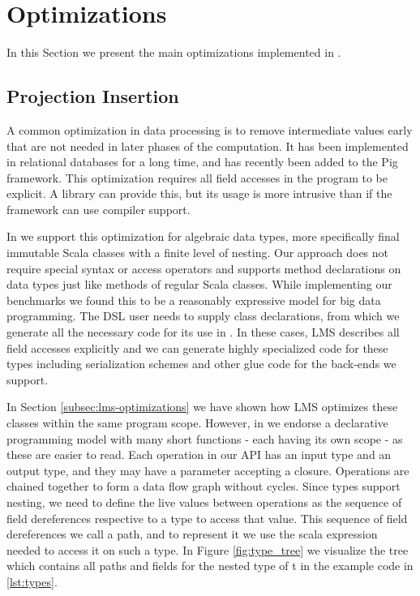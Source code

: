 \section{Optimizations}
\label{sec:optimizations}
In this Section we present the main optimizations implemented in \tool.
\subsection{Projection Insertion}
\label{sec:field-reduction}

A common optimization in data processing is to remove intermediate values early that are not needed in later phases of the computation. It has been implemented in relational databases for a long time, and has recently been added to the Pig framework. This optimization requires all field accesses in the program to be explicit. A library can provide this, but its usage is more intrusive than if the framework can use compiler support. 

In \tool we support this optimization for algebraic data types, more specifically final immutable Scala classes with a finite level of nesting. Our approach does not require special syntax or access operators and supports method declarations on data types just like methods of regular Scala classes. While implementing our benchmarks we found this to be a reasonably expressive model for big data programming. The DSL user needs to supply class declarations, from which we generate all the necessary code for its use in \tool. In these cases, LMS describes all field accesses explicitly and we can generate highly specialized code for these types including serialization schemes and other glue code for the back-ends we support.



In Section \ref{subsec:lms-optimizations} we have shown how LMS optimizes these classes within the same program scope. However, in \tool we endorse a declarative programming model with many short functions - each having its own scope - as these are easier to read. Each operation in our API has an input type and an output type, and they may have a parameter accepting a closure. Operations are chained together to form a data flow graph without cycles. Since types support nesting, we need to define the live values between operations as the sequence of field dereferences respective to a type to access that value. This sequence of field dereferences we call a path, and to represent it we use the scala expression needed to access it on such a type. In Figure \ref{fig:type_tree} we visualize the tree which contains all paths and fields for the nested type of t in the example code in \ref{lst:types}.

